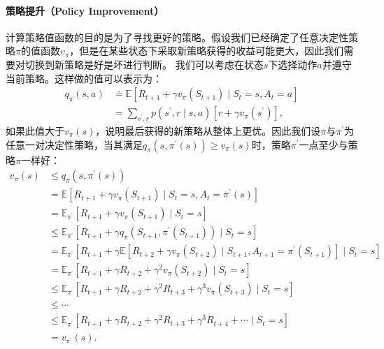 \paragraph{策略提升（Policy Improvement）}
计算策略值函数的目的是为了寻找更好的策略。假设我们已经确定了任意决定性策略$\pi$的值函数$v_{\pi}$，但是在某些状态下采取新策略获得的收益可能更大，因此我们需要对切换到新策略是好是坏进行判断。
我们可以考虑在状态$s$下选择动作$a$并遵守当前策略。这样做的值可以表示为：
\begin{equation*}
  \begin{aligned}
  q_{\pi}(s, a) & \doteq \mathbb{E}\left[R_{t+1}+\gamma v_{\pi}\left(S_{t+1}\right) \mid S_{t}=s, A_{t}=a\right] \\
  &=\sum_{s^{\prime}, r} p\left(s^{\prime}, r \mid s, a\right)\left[r+\gamma v_{\pi}\left(s^{\prime}\right)\right],
  \end{aligned}
\end{equation*}
如果此值大于$v_{\pi}(s)$，说明最后获得的新策略从整体上更优。因此我们设$\pi$与$\pi^{\prime}$为任意一对决定性策略，当其满足$q_{\pi}\left(s, \pi^{\prime}(s)\right) \geq v_{\pi}(s)$时，策略$\pi^{\prime}$一点至少与策略$\pi$一样好：
\begin{equation}
  \begin{aligned}
  v_{\pi}(s) & \leq q_{\pi}\left(s, \pi^{\prime}(s)\right) \\
  &=\mathbb{E}\left[R_{t+1}+\gamma v_{\pi}\left(S_{t+1}\right) \mid S_{t}=s, A_{t}=\pi^{\prime}(s)\right] \\
  &=\mathbb{E}_{\pi^{\prime}}\left[R_{t+1}+\gamma v_{\pi}\left(S_{t+1}\right) \mid S_{t}=s\right] \\
  & \leq \mathbb{E}_{\pi^{\prime}}\left[R_{t+1}+\gamma q_{\pi}\left(S_{t+1}, \pi^{\prime}\left(S_{t+1}\right)\right) \mid S_{t}=s\right] \\
  &=\mathbb{E}_{\pi^{\prime}}\left[R_{t+1}+\gamma \mathbb{E}\left[R_{t+2}+\gamma v_{\pi}\left(S_{t+2}\right) \mid S_{t+1}, A_{t+1}=\pi^{\prime}\left(S_{t+1}\right)\right] \mid S_{t}=s\right] \\
  &=\mathbb{E}_{\pi^{\prime}}\left[R_{t+1}+\gamma R_{t+2}+\gamma^{2} v_{\pi}\left(S_{t+2}\right) \mid S_{t}=s\right] \\
  & \leq \mathbb{E}_{\pi^{\prime}}\left[R_{t+1}+\gamma R_{t+2}+\gamma^{2} R_{t+3}+\gamma^{3} v_{\pi}\left(S_{t+3}\right) \mid S_{t}=s\right] \\
  & \leq \cdots \\
  & \leq \mathbb{E}_{\pi^{\prime}}\left[R_{t+1}+\gamma R_{t+2}+\gamma^{2} R_{t+3}+\gamma^{3} R_{t+4}+\cdots \mid S_{t}=s\right] \\
  &=v_{\pi^{\prime}}(s) .
  \end{aligned}
  \label{eq:dddd}
\end{equation}
